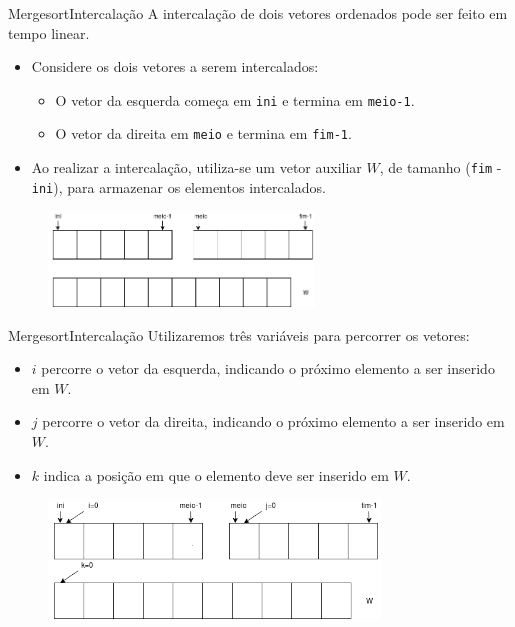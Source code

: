 \documentclass[aspectratio=169]{beamer}
\begin{document}

\begin{frame}[fragile]{Mergesort}{Intercalação}
A intercalação de dois vetores ordenados pode ser feito em tempo linear.
\begin{itemize}
\item Considere os dois vetores a serem intercalados: 
\begin{itemize}
\item O vetor da esquerda começa em \verb|ini| e termina em \verb|meio-1|.
\item O vetor da direita em \verb|meio| e termina em \verb|fim-1|.
\end{itemize}
\item Ao realizar a intercalação, utiliza-se um vetor auxiliar $W$, de tamanho (\verb|fim| - \verb|ini|), para armazenar os elementos intercalados.
\end{itemize}
\begin{figure}[!h]
  \centering
  \includegraphics[width=200pt]{imgs/merge/merge_vetores.png}
  \label{fig_merge_vetores}
\end{figure}
\end{frame}


\begin{frame}{Mergesort}{Intercalação}
Utilizaremos três variáveis para percorrer os vetores:
\begin{itemize}
\item $i$ percorre o vetor da esquerda, indicando o próximo elemento a ser inserido em $W$.
\item $j$ percorre o vetor da direita, indicando o próximo elemento a ser inserido em $W$.
\item $k$ indica a posição em que o elemento deve ser inserido em $W$.
\end{itemize}
\begin{figure}[!h]
  \centering
  \includegraphics[width=250pt]{imgs/merge/merge0.png}
  \label{fig_merge0}
\end{figure}
\end{frame}
\end{document}
